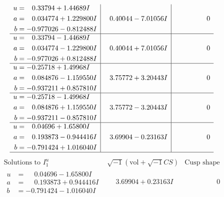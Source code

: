 \documentclass[1p]{elsarticle_modified}
\theoremstyle{definition}
\newcommand{\I}{\sqrt{-1}}
\begin{document}
$$\begin{array}{c|c|c}
\begin{aligned}
u &= \phantom{-}0.33794 + 1.44689 I \\
a &= \phantom{-}0.034774 + 1.229800 I \\
b &= -0.977026 - 0.812488 I\end{aligned}
 & \phantom{-}0.40044 - 7.01056 I & \phantom{-0.000000 } 0 \\ \hline\begin{aligned}
u &= \phantom{-}0.33794 - 1.44689 I \\
a &= \phantom{-}0.034774 - 1.229800 I \\
b &= -0.977026 + 0.812488 I\end{aligned}
 & \phantom{-}0.40044 + 7.01056 I & \phantom{-0.000000 } 0 \\ \hline\begin{aligned}
u &= -0.25718 + 1.49968 I \\
a &= \phantom{-}0.084876 - 1.159550 I \\
b &= -0.937211 + 0.857810 I\end{aligned}
 & \phantom{-}3.75772 + 3.20443 I & \phantom{-0.000000 } 0 \\ \hline\begin{aligned}
u &= -0.25718 - 1.49968 I \\
a &= \phantom{-}0.084876 + 1.159550 I \\
b &= -0.937211 - 0.857810 I\end{aligned}
 & \phantom{-}3.75772 - 3.20443 I & \phantom{-0.000000 } 0 \\ \hline\begin{aligned}
u &= \phantom{-}0.04696 + 1.65800 I \\
a &= \phantom{-}0.193873 - 0.944416 I \\
b &= -0.791424 + 1.016040 I\end{aligned}
 & \phantom{-}3.69904 - 0.23163 I & \phantom{-0.000000 } 0\\
 \hline 
 \end{array}$$\newpage$$\begin{array}{c|c|c}  
\text{Solutions to }I^u_{1}& \I (\text{vol} + \sqrt{-1}CS) & \text{Cusp shape}\\
 \hline 
\begin{aligned}
u &= \phantom{-}0.04696 - 1.65800 I \\
a &= \phantom{-}0.193873 + 0.944416 I \\
b &= -0.791424 - 1.016040 I\end{aligned}
 & \phantom{-}3.69904 + 0.23163 I & \phantom{-0.000000 } 0 \\ \hline\begin{aligned}

\end{aligned}
\end{array}$$
\end{document}
